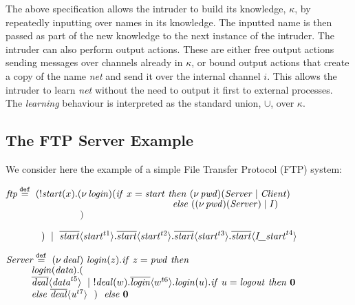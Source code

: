 \documentclass[10pt,a4paper,final,oneside,fleqn]{book}
\newcommand*{\eqdef}{\mathbin{\mathop{=}\limits^{\texttt{def}}}}
\begin{document}
The above specification allows the intruder to build its knowledge, $\kappa$, by repeatedly inputting over names in its knowledge.  The inputted name is then passed as part of the new knowledge to the next instance of the intruder.  The intruder can also perform output actions.  These are either free output actions sending messages over channels already in $\kappa$, or bound output actions that create a copy of the name {\itshape net\/} and send it over the internal channel $i$. This allows the intruder to learn {\itshape net\/} without the need to output it first to external processes.  The {\itshape learning\/} behaviour is interpreted as the standard union, $\cup$, over $\kappa$.
\subsection{The FTP Server Example\label{sect:ftpexample}}
We consider here the example of a simple File Transfer Protocol (FTP) system: \vspace{5mm}

\noindent
$\mbox{{\itshape ftp\/}}\eqdef~(!\mbox{{\itshape start\/}}(x).(\nu~\!\mbox{{\itshape login\/}})(\mbox{{\itshape if\/} }x=\mbox{{\itshape start\/}}\mbox{ {\itshape then\/} }(\nu~\!\mbox{{\itshape pwd\/}})(\mbox{{\itshape Server\/}}\mid\mbox{{\itshape Client\/}})$\\
$~~~~~~~~~~~~~~~~~~~~~~~~~~~~~~~~~~~~~~~~~~~~~~~~~~~\mbox{ {\itshape else\/} }((\nu~\!\mbox{{\itshape pwd\/}})(\mbox{{\itshape Server\/}})\mid I)$\\
$~~~~~~~~~~~~~~~~~~~~~~~~~~~~~~~~~~~)$

\noindent
$~~~~~~~~~~~)~\mid~\overline{\mbox{{\itshape start\/}}}\langle\mbox{{\itshape start\/}}^{t1}\rangle.\overline{\mbox{{\itshape start\/}}}\langle\mbox{{\itshape start\/}}^{t2}\rangle.\overline{\mbox{{\itshape start\/}}}\langle\mbox{{\itshape start\/}}^{t3}\rangle.\overline{\mbox{{\itshape start\/}}}\langle\mbox{{\itshape I\_start\/}}^{t4}\rangle$\vspace{5mm}

\noindent
$\mbox{{\itshape Server\/}}\eqdef~(\nu~\!\mbox{{\itshape deal\/}})~\mbox{{\itshape login\/}}(z).\mbox{{\itshape if\/} }z=\mbox{{\itshape pwd\/} }\mbox{{\itshape then\/}}$\\
$~~~~~~~~\mbox{{\itshape login\/}}(\mbox{{\itshape data}}).($\\
$~~~~~~~~\overline{\mbox{{\itshape deal\/}}}\langle\mbox{{\itshape data\/}}^{t5}\rangle~\mid~!\mbox{{\itshape deal\/}}(w).\overline{\mbox{{\itshape login\/}}}\langle w^{t6}\rangle.\mbox{{\itshape login\/}}(u).\mbox{{\itshape if\/} }u=\mbox{{\itshape logout\/} }\mbox{{\itshape then\/} }{\bf 0}$\\
$~~~~~~~~\mbox{{\itshape else\/} }\overline{\mbox{{\itshape deal\/}}}\langle\mbox{{\itshape u\/}}^{t7}\rangle~~)~~\mbox{{\itshape else\/} }{\bf 0}$
\end{document}
